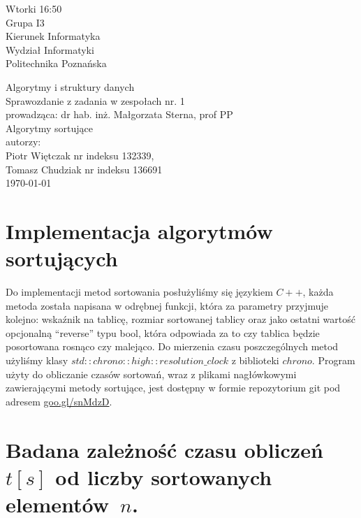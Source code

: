 \documentclass[polish,polish,a4paper]{article}
\begin{document}
	
\begin{spacing}{1.5}
		\begin{titlepage}
			\begin{flushright}
				{ Wtorki 16:50\\
					Grupa I3\\
					Kierunek Informatyka\\
					Wydział Informatyki\\
					Politechnika Poznańska}
			\end{flushright}
		\vspace*{\fill}
		\begin{center}
			{\Large Algorytmy i struktury danych \\[0.1cm]
				Sprawozdanie z zadania w zespołach nr. 1\\[0.1cm]
				prowadząca: dr hab. inż. Małgorzata Sterna, prof PP}\\[0.7cm]
			{\huge Algorytmy sortujące\\ [0.7cm]}
			{\large autorzy:\\[0.1cm]}
			{\large Piotr Więtczak nr indeksu 132339,\\[0.1cm] Tomasz Chudziak nr indeksu 136691}\\[0.5cm]
			\today
		\end{center}
		\vspace*{\fill}
	\end{titlepage}
	
	\section{Implementacja algorytmów sortujących}
	Do implementacji metod sortowania posłużyliśmy się językiem $ C++ $, każda metoda została napisana  w odrębnej  funkcji, która za parametry przyjmuje kolejno: wskaźnik na tablicę, rozmiar sortowanej tablicy oraz jako ostatni wartość opcjonalną “reverse” typu bool, która odpowiada za to czy tablica będzie posortowana rosnąco czy malejąco. Do mierzenia czasu poszczególnych metod użyliśmy klasy $ std::chrono::high::resolution\_clock  $ z biblioteki $ chrono $. Program użyty do obliczanie czasów sortowań, wraz z plikami nagłówkowymi zawierającymi metody sortujące, jest dostępny w formie repozytorium git pod adresem \hyperref{goo.gl/snMdzD}{}{}{goo.gl/snMdzD}.
	\section{Badana zależność czasu obliczeń $ t[s]$ od liczby sortowanych elementów~$ n $. }
	

\end{spacing}
\end{document}
